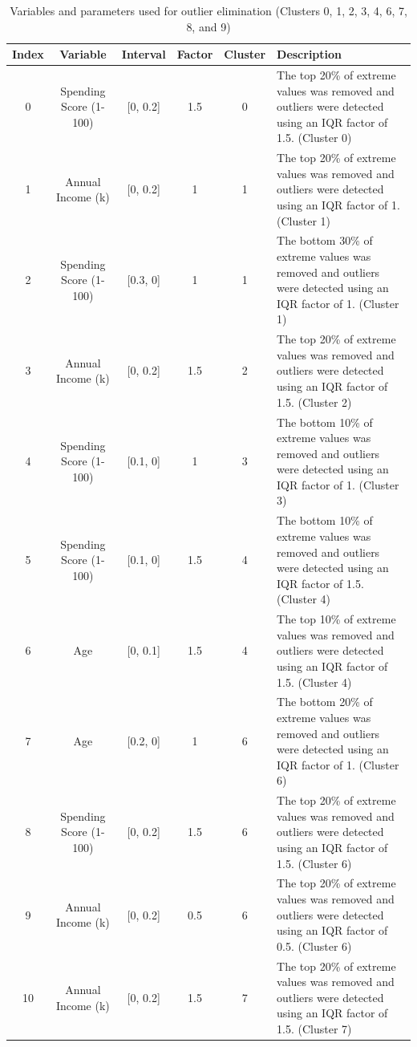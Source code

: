 \documentclass[10pt]{article}
\begin{document}
\begin{table}[p]
    \caption{Variables and parameters used for outlier elimination (Clusters 0, 1, 2, 3, 4, 6, 7, 8, and 9)}
    \label{tab:outliers}
    \centering
    \begin{tabularx}{\textwidth}{c c c c c X}
    \toprule
    Index & Variable & Interval & Factor & Cluster & Description \\
    \midrule
    0  & Spending Score (1-100) & [0, 0.2]   & 1.5 & 0 & The top 20\% of extreme values was removed and outliers were detected using an IQR factor of 1.5. (Cluster 0) \\
    1  & Annual Income (k)      & [0, 0.2]   & 1   & 1 & The top 20\% of extreme values was removed and outliers were detected using an IQR factor of 1. (Cluster 1) \\
    2  & Spending Score (1-100) & [0.3, 0]   & 1   & 1 & The bottom 30\% of extreme values was removed and outliers were detected using an IQR factor of 1. (Cluster 1) \\
    3  & Annual Income (k)      & [0, 0.2]   & 1.5 & 2 & The top 20\% of extreme values was removed and outliers were detected using an IQR factor of 1.5. (Cluster 2) \\
    4  & Spending Score (1-100) & [0.1, 0]   & 1   & 3 & The bottom 10\% of extreme values was removed and outliers were detected using an IQR factor of 1. (Cluster 3) \\
    5  & Spending Score (1-100) & [0.1, 0]   & 1.5 & 4 & The bottom 10\% of extreme values was removed and outliers were detected using an IQR factor of 1.5. (Cluster 4) \\
    6  & Age                    & [0, 0.1]   & 1.5 & 4 & The top 10\% of extreme values was removed and outliers were detected using an IQR factor of 1.5. (Cluster 4) \\
    7  & Age                    & [0.2, 0]   & 1   & 6 & The bottom 20\% of extreme values was removed and outliers were detected using an IQR factor of 1. (Cluster 6) \\
    8  & Spending Score (1-100) & [0, 0.2]   & 1.5 & 6 & The top 20\% of extreme values was removed and outliers were detected using an IQR factor of 1.5. (Cluster 6) \\
    9  & Annual Income (k)      & [0, 0.2]   & 0.5 & 6 & The top 20\% of extreme values was removed and outliers were detected using an IQR factor of 0.5. (Cluster 6) \\
    10 & Annual Income (k)      & [0, 0.2]   & 1.5 & 7 & The top 20\% of extreme values was removed and outliers were detected using an IQR factor of 1.5. (Cluster 7) \\

\end{tabularx}
\end{table}
\end{document}
